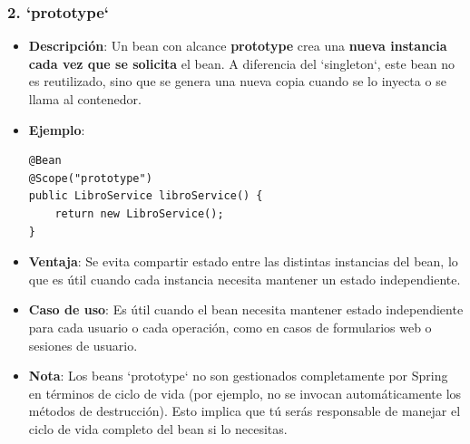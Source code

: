 \documentclass[11pt]{article}
\begin{document}
\subsubsection{2. \textbf{\textbf{`prototype`}}}
\label{sec:orgf6c7f1e}
\begin{itemize}
\item \textbf{\textbf{Descripción}}: Un bean con alcance \textbf{\textbf{prototype}} crea una \textbf{\textbf{nueva instancia cada vez que se solicita}} el bean. A diferencia del `singleton`, este bean no es reutilizado, sino que se genera una nueva copia cuando se lo inyecta o se llama al contenedor.

\item \textbf{\textbf{Ejemplo}}:
\begin{verbatim}
@Bean
@Scope("prototype")
public LibroService libroService() {
    return new LibroService();
}
\end{verbatim}

\item \textbf{\textbf{Ventaja}}: Se evita compartir estado entre las distintas instancias del bean, lo que es útil cuando cada instancia necesita mantener un estado independiente.
\item \textbf{\textbf{Caso de uso}}: Es útil cuando el bean necesita mantener estado independiente para cada usuario o cada operación, como en casos de formularios web o sesiones de usuario.
\item \textbf{\textbf{Nota}}: Los beans `prototype` no son gestionados completamente por Spring en términos de ciclo de vida (por ejemplo, no se invocan automáticamente los métodos de destrucción). Esto implica que tú serás responsable de manejar el ciclo de vida completo del bean si lo necesitas.
\end{itemize}
\end{document}
